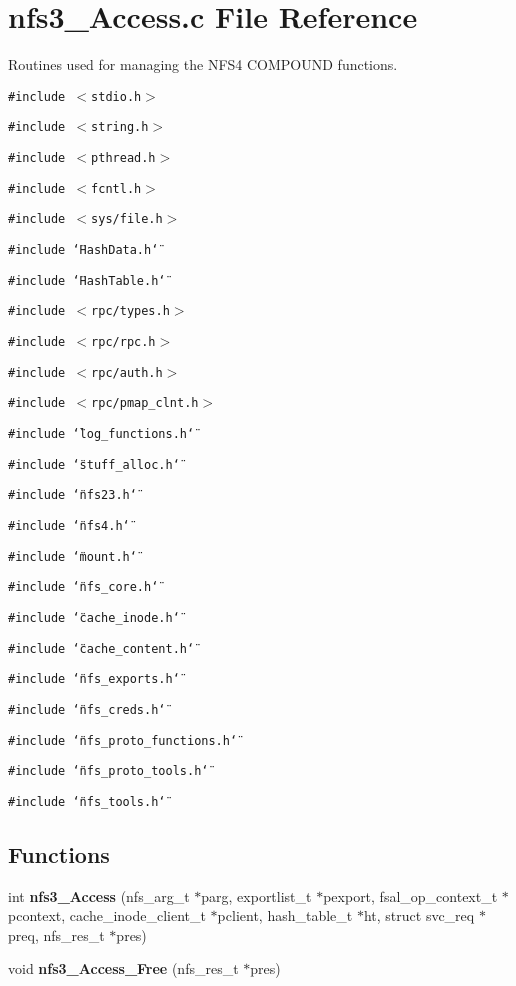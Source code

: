 \section{nfs3\_\-Access.c File Reference}
\label{nfs3__Access_8c}
Routines used for managing the NFS4 COMPOUND functions. 

{\tt \#include $<$stdio.h$>$}\par
{\tt \#include $<$string.h$>$}\par
{\tt \#include $<$pthread.h$>$}\par
{\tt \#include $<$fcntl.h$>$}\par
{\tt \#include $<$sys/file.h$>$}\par
{\tt \#include \char`\"{}Hash\-Data.h\char`\"{}}\par
{\tt \#include \char`\"{}Hash\-Table.h\char`\"{}}\par
{\tt \#include $<$rpc/types.h$>$}\par
{\tt \#include $<$rpc/rpc.h$>$}\par
{\tt \#include $<$rpc/auth.h$>$}\par
{\tt \#include $<$rpc/pmap\_\-clnt.h$>$}\par
{\tt \#include \char`\"{}log\_\-functions.h\char`\"{}}\par
{\tt \#include \char`\"{}stuff\_\-alloc.h\char`\"{}}\par
{\tt \#include \char`\"{}nfs23.h\char`\"{}}\par
{\tt \#include \char`\"{}nfs4.h\char`\"{}}\par
{\tt \#include \char`\"{}mount.h\char`\"{}}\par
{\tt \#include \char`\"{}nfs\_\-core.h\char`\"{}}\par
{\tt \#include \char`\"{}cache\_\-inode.h\char`\"{}}\par
{\tt \#include \char`\"{}cache\_\-content.h\char`\"{}}\par
{\tt \#include \char`\"{}nfs\_\-exports.h\char`\"{}}\par
{\tt \#include \char`\"{}nfs\_\-creds.h\char`\"{}}\par
{\tt \#include \char`\"{}nfs\_\-proto\_\-functions.h\char`\"{}}\par
{\tt \#include \char`\"{}nfs\_\-proto\_\-tools.h\char`\"{}}\par
{\tt \#include \char`\"{}nfs\_\-tools.h\char`\"{}}\par
\subsection*{Functions}
\begin{CompactItemize}
\item 
int {\bf nfs3\_\-Access} (nfs\_\-arg\_\-t $\ast$parg, exportlist\_\-t $\ast$pexport, fsal\_\-op\_\-context\_\-t $\ast$pcontext, cache\_\-inode\_\-client\_\-t $\ast$pclient, hash\_\-table\_\-t $\ast$ht, struct svc\_\-req $\ast$preq, nfs\_\-res\_\-t $\ast$pres)
\item 
void {\bf nfs3\_\-Access\_\-Free} (nfs\_\-res\_\-t $\ast$pres)
\end{CompactItemize}


